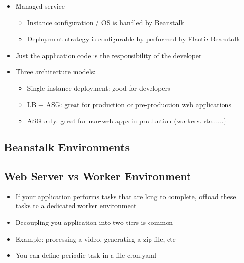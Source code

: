 \begin{itemize}
    \item Managed service
    \begin{itemize}
        \item Instance configuration / OS is handled by Beanstalk
        \item Deployment strategy is configurable by performed by Elastic Beanstalk
    \end{itemize}
    \item Just the application code is the responsibility of the developer
    \item Three architecture models:
    \begin{itemize}
        \item Single instance deployment: good for developers
        \item LB + ASG: great for production or pre-production web applications
        \item ASG only: great for non-web apps in production (workers. etc......)
    \end{itemize}
\end{itemize}

\subsection{Beanstalk Environments}

\subsection{Web Server vs Worker Environment}
\begin{itemize}
    \item If your application performs tasks that are long to complete, offload these tasks to a dedicated worker environment
    \item Decoupling you application into two tiers is common
    \item Example: processing a video, generating a zip file, etc
    \item You can define periodic task in a file cron.yaml
\end{itemize}


